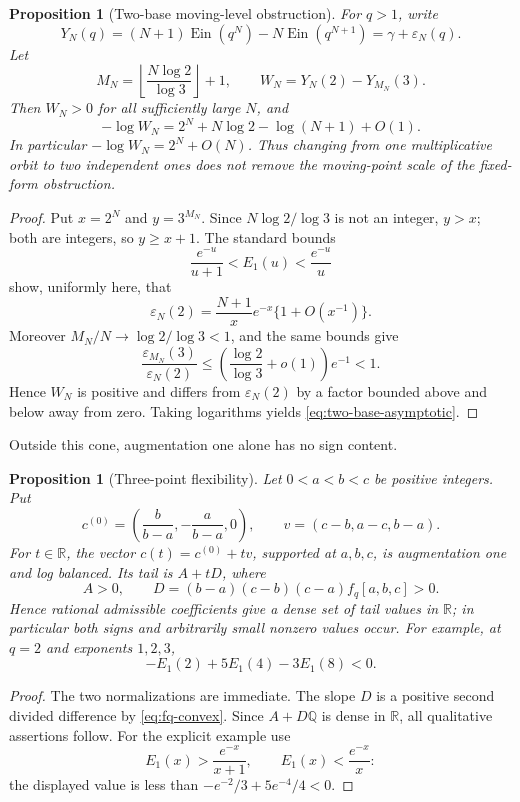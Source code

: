 \documentclass[11pt]{article}
\theoremstyle{keio}
\newtheorem{proposition}[theorem]{Proposition}
\theoremstyle{definition}
\theoremstyle{remark}
\newcommand{\Q}{\mathbb Q}
\newcommand{\R}{\mathbb R}
\newcommand{\Ein}{\operatorname{Ein}}
\begin{document}
\begin{proposition}[Two-base moving-level obstruction]
\label{prop:two-base-obstruction}
For \(q>1\), write
\[
 Y_N(q)=(N+1)\Ein(q^N)-N\Ein(q^{N+1})
       =\gamma+\varepsilon_N(q).
\]
Let
\[
 M_N=\left\lfloor\frac{N\log2}{\log3}\right\rfloor+1,
 \qquad W_N=Y_N(2)-Y_{M_N}(3).
\]
Then \(W_N>0\) for all sufficiently large \(N\), and
\begin{equation}\label{eq:two-base-asymptotic}
 \boxed{\displaystyle
 -\log W_N
 =2^N+N\log2-\log(N+1)+O(1).}
\end{equation}
In particular \(-\log W_N=2^N+O(N)\).  Thus changing from one
multiplicative orbit to two independent ones does not remove the
moving-point scale of the fixed-form obstruction.
\end{proposition}

\begin{proof}
Put \(x=2^N\) and \(y=3^{M_N}\).  Since
\(N\log2/\log3\) is not an integer, \(y>x\); both are integers, so
\(y\ge x+1\).  The standard bounds
\[
 \frac{e^{-u}}{u+1}<E_1(u)<\frac{e^{-u}}u
\]
show, uniformly here, that
\[
 \varepsilon_N(2)
 =\frac{N+1}{x}e^{-x}\{1+O(x^{-1})\}.
\]
Moreover \(M_N/N\to\log2/\log3<1\), and the same bounds give
\[
 \frac{\varepsilon_{M_N}(3)}{\varepsilon_N(2)}
 \le
 \left(\frac{\log2}{\log3}+o(1)\right)e^{-1}<1.
\]
Hence \(W_N\) is positive and differs from \(\varepsilon_N(2)\) by a
factor bounded above and below away from zero.  Taking logarithms yields
\eqref{eq:two-base-asymptotic}.
\end{proof}

Outside this cone, augmentation one alone has no sign content.

\begin{proposition}[Three-point flexibility]
\label{prop:three-point-flexibility}
Let \(0<a<b<c\) be positive integers.  Put
\[
 c^{(0)}=\left(\frac b{b-a},-\frac a{b-a},0\right),
 \qquad
 v=(c-b,a-c,b-a).
\]
For \(t\in\R\), the vector \(c(t)=c^{(0)}+tv\), supported at \(a,b,c\),
is augmentation one and log balanced.  Its tail is \(A+tD\), where
\[
 A>0,
 \qquad
 D=(b-a)(c-b)(c-a)f_q[a,b,c]>0.
\]
Hence rational admissible coefficients give a dense set of tail values in
\(\R\); in particular both signs and arbitrarily small nonzero values occur.
For example, at \(q=2\) and exponents \(1,2,3\),
\[
 -E_1(2)+5E_1(4)-3E_1(8)<0.
\]
\end{proposition}

\begin{proof}
The two normalizations are immediate.  The slope \(D\) is a positive second
divided difference by \eqref{eq:fq-convex}.  Since \(A+D\Q\) is dense in
\(\R\), all qualitative assertions follow.  For the explicit example use
\[
 E_1(x)>\frac{e^{-x}}{x+1},
 \qquad
 E_1(x)<\frac{e^{-x}}x:
\]
the displayed value is less than
\(-e^{-2}/3+5e^{-4}/4<0\).
\end{proof}
\end{document}
